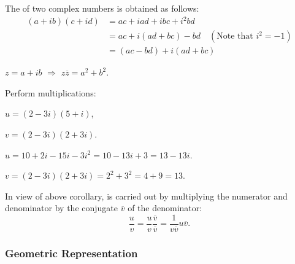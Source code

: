 \documentclass[11pt]{amsbook}
\begin{document}
\begin{defn}[Multiplication]
	The  of two complex numbers 
	is obtained as follows:
	\begin{align*}
		(a + ib)(c + id) 
		&= ac + iad + ibc + i^{2}bd \\
		&= ac + i(ad + bc) - bd \quad (\text{Note that } i^{2} = -1)\\
		&= (ac - bd) + i(ad + bc)
	\end{align*}
\end{defn}

\begin{cor}
	$z = a + ib$ 
	$\Longrightarrow$ 
	$z \overline{z} = a^{2} + b^{2}$.
\end{cor}

\begin{exmp}
	Perform multiplications:
	\begin{hEnumerateAlpha}
		
		\item 
		$u = (2 - 3i)(5 + i)$,
		
		\item 
		$v = (2 - 3i)(2 + 3i)$.
	\end{hEnumerateAlpha}
	\begin{hSolution}
		\begin{hEnumerateAlpha}
			
			\item 
			$u = 10 + 2i - 15i - 3i^{2}
			= 10 - 13i + 3 
			= 13 - 13i$.
			
			\item 
			$v = (2 - 3i)(2 + 3i) 
			= 2^{2} + 3^{2} 
			= 4 + 9 = 13$.
		\end{hEnumerateAlpha}
	\end{hSolution}
\end{exmp}

\begin{defn}
	In view of above corollary, 
	 is carried out 
	by multiplying the numerator and denominator 
	by the conjugate $\overline{v}$ of the denominator:
	\[
		\dfrac{u}{v} 
		= \dfrac{u}{v} \dfrac{\overline{v}}{\overline{v}}
		= \dfrac{1}{v \overline{v}} u \overline{v}.
	\]
\end{defn}




\subsubsection{Geometric Representation}
\label{subsubsec:GeometricRepresentation}
\end{document}
